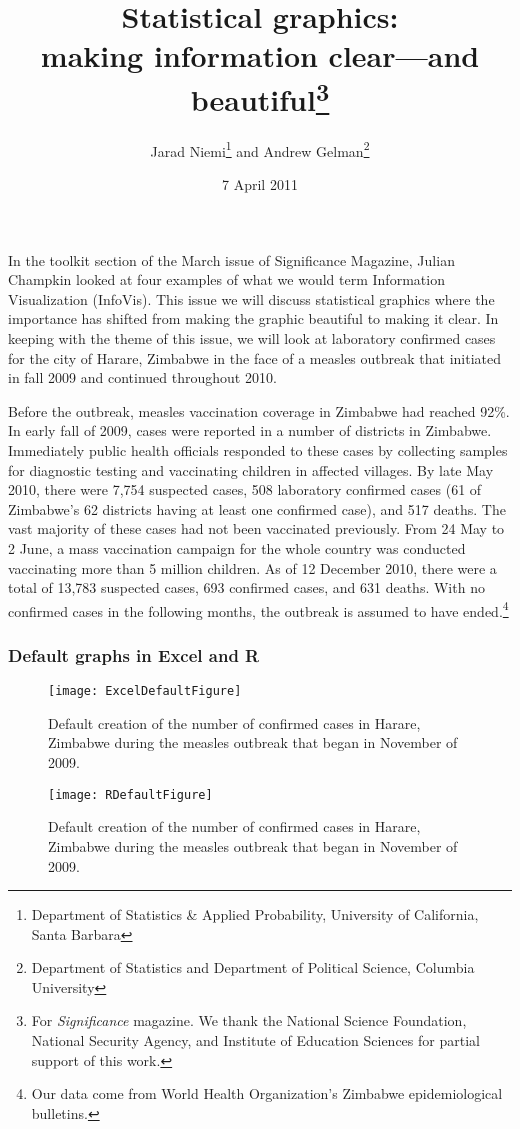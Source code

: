 \documentclass[12pt]{article}
\title{Statistical graphics:\\making information clear---and beautiful\footnote{For {\em Significance} magazine.  We thank the National Science Foundation, National Security Agency, and Institute of Education Sciences for partial support of this work.}}
\author{Jarad Niemi\footnote{Department of Statistics \& Applied Probability, University of California, Santa Barbara} and Andrew Gelman\footnote{Department of Statistics and Department of Political Science, Columbia University}}
\date{7 April 2011}
\begin{document}
\maketitle

In the toolkit section of the March issue of Significance Magazine, Julian Champkin looked at four examples of what we would term Information Visualization (InfoVis). This issue we will discuss statistical graphics where the importance has shifted from making the graphic beautiful to making it clear. In keeping with the theme of this issue, we will look at laboratory confirmed cases for the city of Harare, Zimbabwe in the face of a measles outbreak that initiated in fall 2009 and continued throughout 2010. 

Before the outbreak, measles vaccination coverage in Zimbabwe had reached 92\%. In early fall of 2009, cases were reported in a number of districts in Zimbabwe. Immediately public health officials responded to these cases by collecting samples for diagnostic testing and vaccinating children in affected villages. By late May 2010, there were 7,754 suspected cases, 508 laboratory confirmed cases (61 of Zimbabwe's 62 districts having at least one confirmed case), and 517 deaths. The vast majority of these cases had not been vaccinated previously. From 24 May to 2 June, a mass vaccination campaign for the whole country was conducted vaccinating more than 5 million children. As of 12 December 2010, there were a total of 13,783 suspected cases, 693 confirmed cases, and 631 deaths.  With no confirmed cases in the following months, the outbreak is assumed to have ended.\footnote{Our data come from World Health Organization's Zimbabwe epidemiological bulletins.}

\subsubsection*{Default graphs in Excel and R}

\begin{figure}[ht]
\centering
\texttt{[image: ExcelDefaultFigure]}
\caption{Default creation of the number of confirmed cases in Harare, Zimbabwe during the measles outbreak that began in November of 2009.}
\label{fig:ExcelDefaultFigure}
\end{figure}

\begin{figure}[ht]
\centering
\texttt{[image: RDefaultFigure]}
\caption{Default creation of the number of confirmed cases in Harare, Zimbabwe during the measles outbreak that began in November of 2009.}
\label{fig:RDefaultFigure}
\end{figure}
\end{document}

